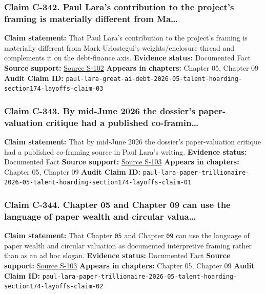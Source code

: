 \documentclass[
  american,
  11pt,
  letterpaper,
]{article}
\begin{document}
\subsubsection{Claim C-342. Paul Lara's contribution to the project's
framing is materially different from
Ma\ldots{}}\label{claim-c-342-paul-lara-s-contribution-to-the-project-s-framing-is-materially-different-from-ma}

\textbf{Claim statement:} That Paul Lara's contribution to the project's
framing is materially different from Mark Uriostegui's weights/enclosure
thread and complements it on the debt-finance axis. \textbf{Evidence
status:} Documented Fact \textbf{Source support:}
\hyperref[source-s-102-la-gran-deuda-por-la-ia]{Source S-102}
\textbf{Appears in chapters:} Chapter 05, Chapter 09 \textbf{Audit Claim
ID:}
\texttt{paul-lara-great-ai-debt-2026-05-talent-hoarding-section174-layoffs-claim-03}

\subsubsection{Claim C-343. By mid-June 2026 the dossier's
paper-valuation critique had a published
co-framin\ldots{}}\label{claim-c-343-by-mid-june-2026-the-dossier-s-paper-valuation-critique-had-a-published-co-framin}

\textbf{Claim statement:} That by mid-June 2026 the dossier's
paper-valuation critique had a published co-framing source in Paul
Lara's writing. \textbf{Evidence status:} Documented Fact \textbf{Source
support:} \hyperref[source-s-103-el-trillonario-de-papel]{Source S-103}
\textbf{Appears in chapters:} Chapter 05, Chapter 09 \textbf{Audit Claim
ID:}
\texttt{paul-lara-paper-trillionaire-2026-05-talent-hoarding-section174-layoffs-claim-01}

\subsubsection{Claim C-344. Chapter 05 and Chapter 09 can use the
language of paper wealth and circular
valua\ldots{}}\label{claim-c-344-chapter-05-and-chapter-09-can-use-the-language-of-paper-wealth-and-circular-valua}

\textbf{Claim statement:} That Chapter \texttt{05} and Chapter
\texttt{09} can use the language of paper wealth and circular valuation
as documented interpretive framing rather than as an ad hoc slogan.
\textbf{Evidence status:} Documented Fact \textbf{Source support:}
\hyperref[source-s-103-el-trillonario-de-papel]{Source S-103}
\textbf{Appears in chapters:} Chapter 05, Chapter 09 \textbf{Audit Claim
ID:}
\texttt{paul-lara-paper-trillionaire-2026-05-talent-hoarding-section174-layoffs-claim-02}
\end{document}
